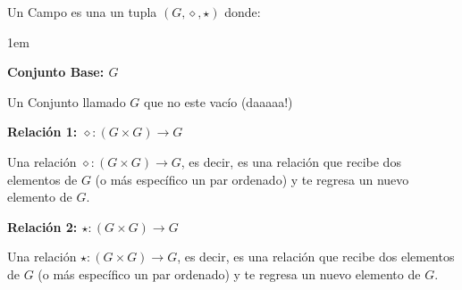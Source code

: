 \documentclass[12pt, fleqn]{report}                             %
\newenvironment{Indentation}[1][0.75em]                         %
        {\begin{adjustwidth}{#1}{}}                                 %
        {\end{adjustwidth}}                                         %
\theoremstyle{break}                                            %
\begin{document}
                Un Campo es una un tupla $(G, \diamond, \star)$ donde:
                \begin{Indentation}[1em]
                \begin{itemize}
                \small{
                    
                    \item
                        \textbf{Conjunto Base: $G$}

                        Un Conjunto llamado $G$ que no este vacío (daaaaa!)

                    \item
                        \textbf{Relación 1: $\diamond: (G \times  G) \to G$}

                        Una relación $\diamond: (G \times  G) \to G$, es decir, es una relación
                        que recibe dos elementos de $G$ (o más específico un par ordenado) y te
                        regresa un nuevo elemento de $G$.

                    \item
                        \textbf{Relación 2: $\star: (G \times  G) \to G$}

                        Una relación $\star: (G \times  G) \to G$, es decir, es una relación
                        que recibe dos elementos de $G$ (o más específico un par ordenado) y te
                        regresa un nuevo elemento de $G$.
                }
                \end{itemize}
                \end{Indentation}
\end{document}

